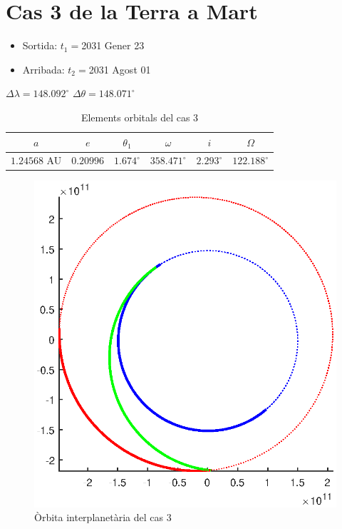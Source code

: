 \section{Cas 3 de la Terra a Mart}
\begin{itemize}
	\item Sortida: $t_{1}=$2031 Gener 23
	\item Arribada: $t_{2}=$2031 Agost 01
\end{itemize}
$\Delta\lambda=148.092^{\circ}$
$\Delta\theta=148.071^{\circ}$
\begin{table}[h!]
	\centering
	\begin{tabular}{ |c|c|c|c|c|c|}
		\hline
		$a$ & $e$ & $\theta_{1}$ & $\omega$ & $i$ & $\Omega$ \\ \hline
		$1.24568$ AU  & $0.20996$ & $1.674^{\circ}$ & $358.471^{\circ}$ & $2.293^{\circ}$ & $122.188^{\circ}$ \\ \hline
	\end{tabular}
	\caption{Elements orbitals del cas 3}
\end{table}
\begin{figure}[H]
	\centering
	\includegraphics[scale=0.8]{./plots/cas3}
	\caption{Òrbita interplanetària del cas 3}
\end{figure}

